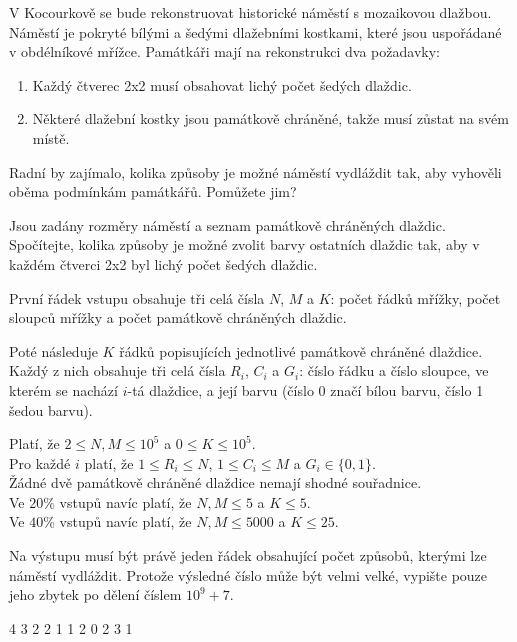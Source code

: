 





V Kocourkově se bude rekonstruovat historické náměstí s mozaikovou dlažbou.
Náměstí je pokryté bílými a šedými dlažebními kostkami, které jsou uspořádané
v obdélníkové mřížce. Památkáři mají na rekonstrukci dva požadavky:

\begin{enumerate}[nolistsep]
\item Každý čtverec 2x2 musí obsahovat lichý počet šedých dlaždic.
\item Některé dlažební kostky jsou památkově chráněné, takže musí zůstat na svém
  místě.
\end{enumerate}

Radní by zajímalo, kolika způsoby je možné náměstí vydláždit tak, aby vyhověli
oběma podmínkám památkářů. Pomůžete jim?


Jsou zadány rozměry náměstí a seznam památkově chráněných dlaždic. Spočítejte,
kolika způsoby je možné zvolit barvy ostatních dlaždic tak, aby v každém čtverci
2x2 byl lichý počet šedých dlaždic.


První řádek vstupu obsahuje tři celá čísla $N$, $M$ a $K$: počet řádků mřížky,
počet sloupců mřížky a počet památkově chráněných dlaždic.

Poté následuje $K$ řádků popisujících jednotlivé památkově chráněné dlaždice.
Každý z nich obsahuje tři celá čísla $R_i$, $C_i$ a $G_i$: číslo řádku a číslo
sloupce, ve kterém se nachází $i$-tá dlaždice, a její barvu (číslo 0 značí bílou
barvu, číslo 1 šedou barvu).

\bigskip
\noindent
Platí, že $2 \leq N,M \leq 10^5$ a $0 \leq K \leq 10^5$.\\
Pro každé $i$ platí, že $1 \leq R_i \leq N$, $1 \leq C_i \leq M$ a
  $G_i \in \{ 0, 1 \}$.\\
Žádné dvě památkově chráněné dlaždice nemají shodné souřadnice.\\
Ve $20\%$ vstupů navíc platí, že $N,M \leq 5$ a $K \leq 5$.\\
Ve $40\%$ vstupů navíc platí, že $N,M \leq 5000$ a $K \leq 25$.


Na výstupu musí být právě jeden řádek obsahující počet způsobů, kterými lze
náměstí vydláždit. Protože výsledné číslo může být velmi velké, vypište pouze
jeho zbytek po dělení číslem $10^9 + 7$.


 4 3
2 2 1
1 2 0
2 3 1
\sampleEND


